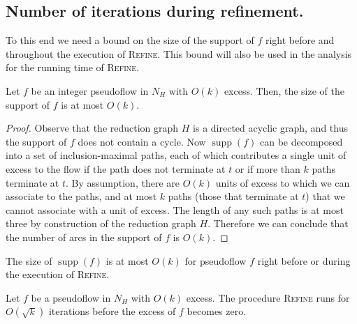 \documentclass[a4paper,UKenglish]{socg-lipics-v2018}
\def\etal{\emph{et~al.}}
\def\etal{\textit{et~al.}}
\def\supp{\operatorname{supp}}
\theoremstyle{plain}
\numberwithin{figure}{section}
\begin{document}
\begin{toappendix}
\subsection{Number of iterations during refinement.}
\label{SSA:num-iterations-refine}


To this end we need a bound on the size of the support of $f$ right before and throughout the execution of \textsc{Refine}.
This bound will also be used in the analysis for the running time of \textsc{Refine}.

\begin{lemmarep}
\label{lemma:reduction_count}
Let $f$ be an integer pseudoflow in $N_H$ with $O(k)$ excess.
Then, the size of the support of $f$ is at most $O(k)$.
\end{lemmarep}

\begin{proof}
Observe that the reduction graph $H$ is a directed acyclic graph, and thus the support of $f$ does not contain a cycle.
Now $\supp(f)$ can be decomposed into a set of inclusion-maximal paths,
each of which contributes a single unit of excess to the flow if the path does not terminate at $t$ or if more than $k$ paths terminate at $t$.
By assumption, there are $O(k)$ units of excess to which we can associate to the paths, and at most $k$ paths (those that terminate at $t$) that we cannot associate with a unit of excess.
The length of any such paths is at most  three by construction of the reduction graph $H$.
Therefore we can conclude that the number of arcs in the support of $f$ is $O(k)$.
\end{proof}

\begin{corollary}
\label{corollary:support_size_during}
The size of $\supp(f)$ is at most $O(k)$ for pseudoflow $f$ right before or during the execution of \textsc{Refine}.
\end{corollary}

\end{toappendix}


\begin{lemmarep}
\label{lemma:goldberg_refine_iterations}
Let $f$ be a pseudoflow in $N_H$ with $O(k)$ excess.
The procedure \textsc{Refine} runs for $O(\sqrt{k})$ iterations
before the excess of $f$ becomes zero.
\end{lemmarep}
\end{document}
